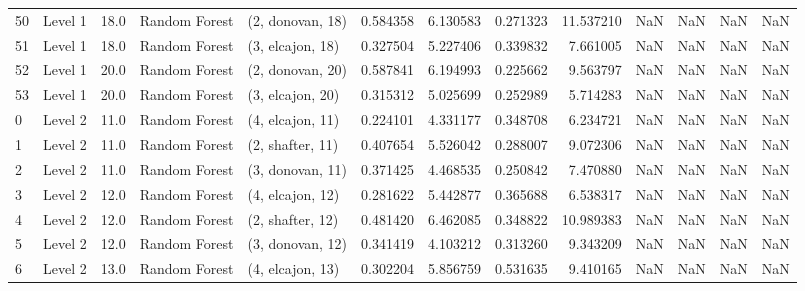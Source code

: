 \begin{tabular}{llrllrrrrrrrr}
50 &   Level 1 &   18.0 &  Random Forest &  (2, donovan, 18) &   0.584358 &   6.130583 &  0.271323 &  11.537210 &                  NaN &                    NaN &                 NaN &                   NaN \\
51 &   Level 1 &   18.0 &  Random Forest &  (3, elcajon, 18) &   0.327504 &   5.227406 &  0.339832 &   7.661005 &                  NaN &                    NaN &                 NaN &                   NaN \\
52 &   Level 1 &   20.0 &  Random Forest &  (2, donovan, 20) &   0.587841 &   6.194993 &  0.225662 &   9.563797 &                  NaN &                    NaN &                 NaN &                   NaN \\
53 &   Level 1 &   20.0 &  Random Forest &  (3, elcajon, 20) &   0.315312 &   5.025699 &  0.252989 &   5.714283 &                  NaN &                    NaN &                 NaN &                   NaN \\
0  &   Level 2 &   11.0 &  Random Forest &  (4, elcajon, 11) &   0.224101 &   4.331177 &  0.348708 &   6.234721 &                  NaN &                    NaN &                 NaN &                   NaN \\
1  &   Level 2 &   11.0 &  Random Forest &  (2, shafter, 11) &   0.407654 &   5.526042 &  0.288007 &   9.072306 &                  NaN &                    NaN &                 NaN &                   NaN \\
2  &   Level 2 &   11.0 &  Random Forest &  (3, donovan, 11) &   0.371425 &   4.468535 &  0.250842 &   7.470880 &                  NaN &                    NaN &                 NaN &                   NaN \\
3  &   Level 2 &   12.0 &  Random Forest &  (4, elcajon, 12) &   0.281622 &   5.442877 &  0.365688 &   6.538317 &                  NaN &                    NaN &                 NaN &                   NaN \\
4  &   Level 2 &   12.0 &  Random Forest &  (2, shafter, 12) &   0.481420 &   6.462085 &  0.348822 &  10.989383 &                  NaN &                    NaN &                 NaN &                   NaN \\
5  &   Level 2 &   12.0 &  Random Forest &  (3, donovan, 12) &   0.341419 &   4.103212 &  0.313260 &   9.343209 &                  NaN &                    NaN &                 NaN &                   NaN \\
6  &   Level 2 &   13.0 &  Random Forest &  (4, elcajon, 13) &   0.302204 &   5.856759 &  0.531635 &   9.410165 &                  NaN &                    NaN &                 NaN &                   NaN \\

\end{tabular}
